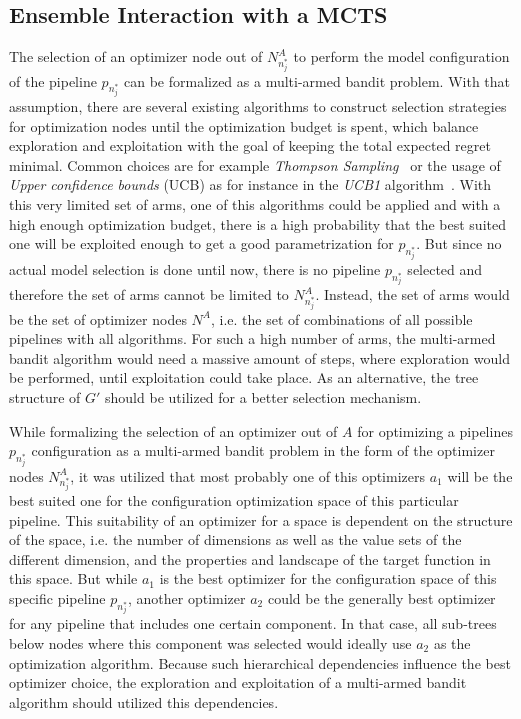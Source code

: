 \subsection{Ensemble Interaction with a MCTS}
\label{sec:approach:selection:mcts}
The selection of an optimizer node out of $N^A_{n^*_j}$ to perform the model configuration of the pipeline $p_{n^*_j}$ can be formalized as a multi-armed bandit problem.
With that assumption, there are several existing algorithms to construct selection strategies for optimization nodes until the optimization budget is spent, which balance exploration and exploitation with the goal of keeping the total expected regret minimal.
Common choices are for example \textit{Thompson Sampling}~\cite{Thompson-Sampling} or the usage of \textit{Upper confidence bounds} (UCB) as for instance in the \textit{UCB1} algorithm~\cite{Auer-UCB1}.\newline
With this very limited set of arms, one of this algorithms could be applied and with a high enough optimization budget, there is a high probability that the best suited one will be exploited enough to get a good parametrization for $p_{n^*_j}$.
But since no actual model selection is done until now, there is no pipeline $p_{n^*_j}$ selected and therefore the set of arms cannot be limited to $N^A_{n^*_j}$.
Instead, the set of arms would be the set of optimizer nodes $N^A$, i.e. the set of combinations of all possible pipelines with all algorithms.\newline
For such a high number of arms, the multi-armed bandit algorithm would need a massive amount of steps, where exploration would be performed, until exploitation could take place.
As an alternative, the tree structure of $G'$ should be utilized for a better selection mechanism.

While formalizing the selection of an optimizer out of $A$ for optimizing a pipelines $p_{n^*_j}$ configuration as a multi-armed bandit problem in the form of the optimizer nodes $N^A_{n^*_j}$, it was utilized that most probably one of this optimizers $a_1$ will be the best suited one for the configuration optimization space of this particular pipeline.
This suitability of an optimizer for a space is dependent on the structure of the space, i.e. the number of dimensions as well as the value sets of the different dimension, and the properties and landscape of the target function in this space.\newline
But while $a_1$ is the best optimizer for the configuration space of this specific pipeline $p_{n^*_j}$, another optimizer $a_2$ could be the generally best optimizer for any pipeline that includes one certain component.
In that case, all sub-trees below nodes where this component was selected would ideally use $a_2$ as the optimization algorithm.
Because such hierarchical dependencies influence the best optimizer choice, the exploration and exploitation of a multi-armed bandit algorithm should utilized this dependencies.

